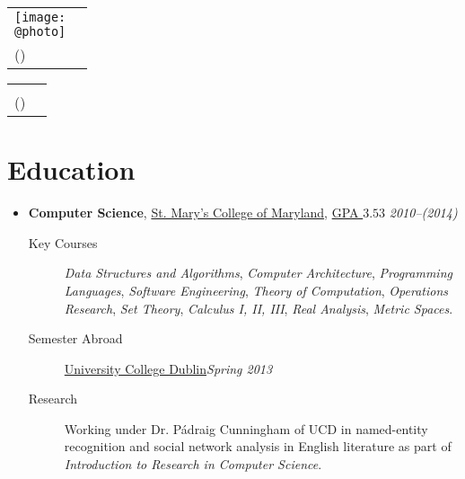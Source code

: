 \documentclass[11pt,a4paper]{article}
\author{Sean Allred}
\makeatletter
\newcommand{\position}[5]{\item%
  \begin{tabular*}{1.0\linewidth}{l@{\extracolsep{\fill}}r}
    #1 & #2\\
    \textit{#3} & \textit{#4---#5}
  \end{tabular*}}
\renewcommand{\position}[6][]{%
\item[#1] \hspace*{-2em}\textbf{#4}, #2, #3\hfill
  \textit{#5--#6}\vspace*{-.8em}}
\renewcommand{\maketitle}{%
  \noindent
  \ifdefined\@photo
  \usepackage{multirow}
  \begin{tabular*}{1.0\linewidth}{l@{\extracolsep{\fill}}r}
    \multirow{2}{*}{\texttt{[image: \\@photo]}}\\
     {\@namestyle\@author}           & \@addressA\\
    {\@emailstyle\@email} (\@phone)  & \@addressB
  \end{tabular*}
  \else
  \begin{tabular*}{1.0\linewidth}{l@{\extracolsep{\fill}}r}
     {\@namestyle\@author}           & \@addressA\\
    {\@emailstyle\@email} (\@phone)  & \@addressB
  \end{tabular*}
  \fi
}
\newcommand{\course}[1]{\textit{#1}}
\newcommand{\smcm}{\href{http://www.smcm.edu}
                        {St. Mary's College of Maryland}}
\makeatother
\begin{document}
\maketitle

\section*{Education}
\begin{itemize}
\position[] {\smcm}
          {\href{http://dl.dropbox.com/u/17471132/transcript20130330.pdf}
                {GPA $3.53$}}
          {Computer Science}
          {2010}{(2014)}
          \begin{description}
          \item[Key Courses]
            \course{Data Structures and Algorithms},
            \course{Computer Architecture},
            \course{Programming Languages},
            \course{Software Engineering},
            \course{Theory of Computation},
            \course{Operations Research},
            \course{Set Theory},
            \course{Calculus I, II, III},
            \course{Real Analysis},
            \course{Metric Spaces}.
          \item[Semester Abroad] \href{http://www.ucd.ie}{University College Dublin}\hfill \textit{Spring 2013}
          \item[Research] Working under Dr. P\'adraig Cunningham of UCD in named-entity recognition and social network analysis in English literature as part of \course{Introduction to Research in Computer Science}.
          \end{description}
\end{itemize}
\end{document}
